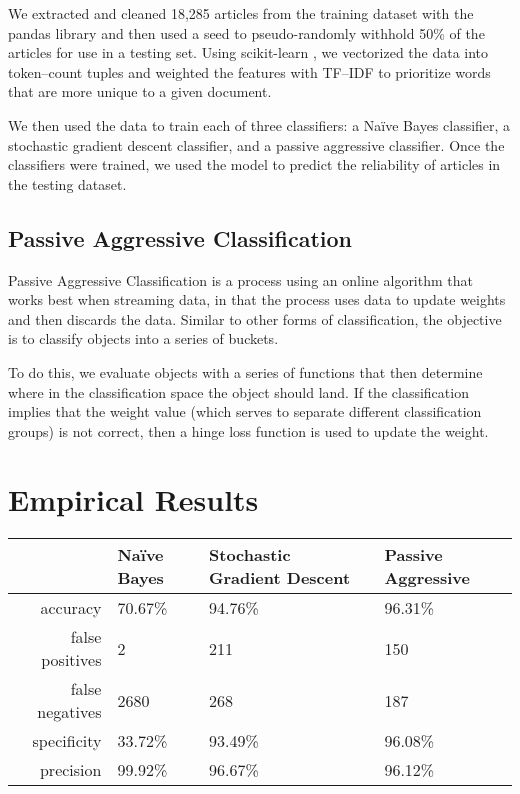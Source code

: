 \documentclass[12pt]{article}
\begin{document}
	We extracted and cleaned 18,285 articles from the training dataset with the pandas library \cite{pandas} and then used a seed to pseudo-randomly withhold 50\% of the articles for use in a testing set. Using scikit-learn \cite{scikit-learn}, we vectorized the data into token--count tuples and weighted the features with TF--IDF to prioritize words that are more unique to a given document.

	We then used the data to train each of three classifiers: a Naïve Bayes classifier, a stochastic gradient descent classifier, and a passive aggressive classifier. Once the classifiers were trained, we used the model to predict the reliability of articles in the testing dataset.

	\subsection{Passive Aggressive Classification}

    Passive Aggressive Classification is a process using an online algorithm that works best when streaming data, in that the process uses data to update weights and then discards the data. Similar to other forms of classification, the objective is to classify objects into a series of buckets.

    To do this, we evaluate objects with a series of functions that then determine where in the classification space the object should land. If the classification implies that the weight value (which serves to separate different classification groups) is not correct, then a hinge loss function is used to update the weight.

	\section{Empirical Results}

	\begin{tabular}{r | l l l}
		                & Naïve Bayes & Stochastic Gradient Descent & Passive Aggressive \\
		\hline
		accuracy        & 70.67\%     & 94.76\%                     & 96.31\%            \\
		false positives & 2           & 211                         & 150                \\
		false negatives & 2680        & 268                         & 187                \\
		specificity     & 33.72\%     & 93.49\%                     & 96.08\%            \\
		precision       & 99.92\%     & 96.67\%                     & 96.12\%            \\
	\end{tabular}
    \break
\end{document}
